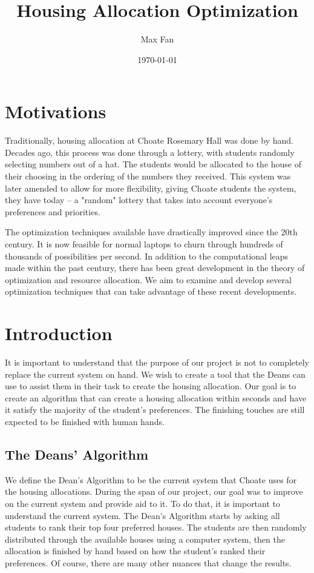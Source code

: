 \documentclass[11pt]{article}
\author{Max Fan}
\date{\today}
\title{Housing Allocation Optimization}
\begin{document}
\maketitle

\section{Motivations}
\label{sec:org47c1139}
Traditionally, housing allocation at Choate Rosemary Hall was done by hand.
Decades ago, this process was done through a lottery, with students randomly selecting numbers out of a hat.
The students would be allocated to the house of their choosing in the ordering of the numbers they received.
This system was later amended to allow for more flexibility, giving Choate students the system, they have today -- a "random" lottery that takes into account everyone's preferences and priorities.

The optimization techniques available have drastically improved since the 20th century.
It is now feasible for normal laptops to churn through hundreds of thousands of possibilities per second.
In addition to the computational leaps made within the past century, there has been great development in the theory of optimization and resource allocation.
We aim to examine and develop several optimization techniques that can take advantage of these recent developments.

\section{Introduction}
\label{sec:orgc44ba09}
It is important to understand that the purpose of our project is not to completely replace the current system on hand. We wish to create a tool that the Deans can use to assist them in their task to create the housing allocation. Our goal is to create an algorithm that can create a housing allocation within seconds and have it satisfy the majority of the student’s preferences. The finishing touches are still expected to be finished with human hands.


\subsection{The Deans' Algorithm}
\label{sec:orgea12a01}
We define the Dean’s Algorithm to be the current system that Choate uses for the housing allocations. During the span of our project, our goal was to improve on the current system and provide aid to it. To do that, it is important to understand the current system.
The Dean’s Algorithm starts by asking all students to rank their top four preferred houses. The students are then randomly distributed through the available houses using a computer system, then the allocation is finished by hand based on how the student’s ranked their preferences. Of course, there are many other nuances that change the results.
\end{document}
